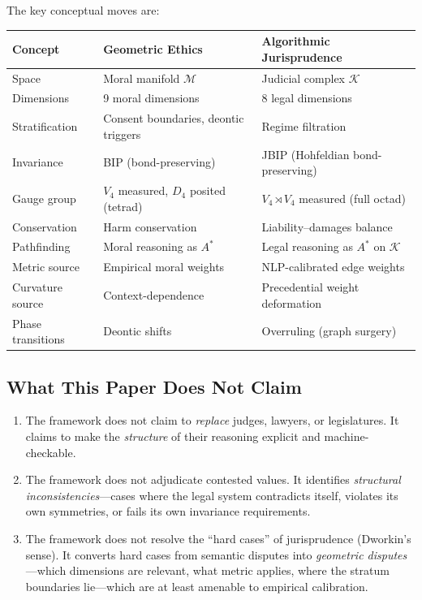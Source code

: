 \documentclass[12pt]{article}
\theoremstyle{definition}
\theoremstyle{remark}
\newcommand{\M}{\mathcal{M}}               %
\begin{document}
The key conceptual moves are:

\begin{center}
\begin{tabular}{lll}
\toprule
\textbf{Concept} & \textbf{Geometric Ethics} & \textbf{Algorithmic Jurisprudence} \\
\midrule
Space & Moral manifold $\M$ & Judicial complex $\mathcal{K}$ \\
Dimensions & 9 moral dimensions & 8 legal dimensions \\
Stratification & Consent boundaries, deontic triggers & Regime filtration \\
Invariance & BIP (bond-preserving) & JBIP (Hohfeldian bond-preserving) \\
Gauge group & $V_4$ measured, $D_4$ posited (tetrad) & $V_4 \rtimes V_4$ measured (full octad) \\
Conservation & Harm conservation & Liability--damages balance \\
Pathfinding & Moral reasoning as $A^*$ & Legal reasoning as $A^*$ on $\mathcal{K}$ \\
Metric source & Empirical moral weights & NLP-calibrated edge weights \\
Curvature source & Context-dependence & Precedential weight deformation \\
Phase transitions & Deontic shifts & Overruling (graph surgery) \\
\bottomrule
\end{tabular}
\end{center}

\subsection{What This Paper Does Not Claim}

\begin{enumerate}
    \item The framework does not claim to \emph{replace} judges, lawyers, or legislatures.  It claims to make the \emph{structure} of their reasoning explicit and machine-checkable.
    \item The framework does not adjudicate contested values.  It identifies \emph{structural inconsistencies}---cases where the legal system contradicts itself, violates its own symmetries, or fails its own invariance requirements.
    \item The framework does not resolve the ``hard cases'' of jurisprudence (Dworkin's sense).  It converts hard cases from semantic disputes into \emph{geometric disputes}---which dimensions are relevant, what metric applies, where the stratum boundaries lie---which are at least amenable to empirical calibration.
\end{enumerate}
\end{document}
